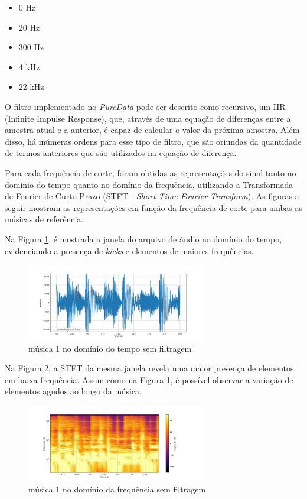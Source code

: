 \begin{itemize}
    \item 0 Hz
    \item 20 Hz
    \item 300 Hz
    \item 4 kHz
    \item 22 kHz
\end{itemize}

O filtro implementado no \textit{PureData} pode ser descrito como recursivo, um IIR (Infinite Impulse Response), que, através de uma equação de diferenças entre a amostra atual e a anterior, é capaz de calcular o valor da próxima amostra. Além disso, há inúmeras ordens para esse tipo de filtro, que são oriundas da quantidade de termos anteriores que são utilizados na equação de diferença.

Para cada frequência de corte, foram obtidas as representações do sinal tanto no domínio do tempo quanto no domínio da frequência, utilizando a Transformada de Fourier de Curto Prazo (STFT - \textit{Short Time Fourier Transform}). As figuras a seguir mostram as representações em função da frequência de corte para ambas as músicas de referência.

Na Figura \ref{fig40}, é mostrada a janela do arquivo de áudio no domínio do tempo, evidenciando a presença de \textit{kicks} e elementos de maiores frequências.

\begin{figure}[h]
    \centering
    \includegraphics[width=0.7\textwidth]{figuras/fig40.png}
    \caption{música 1 no domínio do tempo sem filtragem}
    \label{fig40}
\end{figure}

Na Figura \ref{fig41}, a STFT da mesma janela revela uma maior presença de elementos em baixa frequência. Assim como na Figura \ref{fig40}, é possível observar a variação de elementos agudos ao longo da música.

\begin{figure}[h]
    \centering
    \includegraphics[width=0.7\textwidth]{figuras/fig41.png}
    \caption{música 1 no domínio da frequência sem filtragem}
    \label{fig41}
\end{figure}

